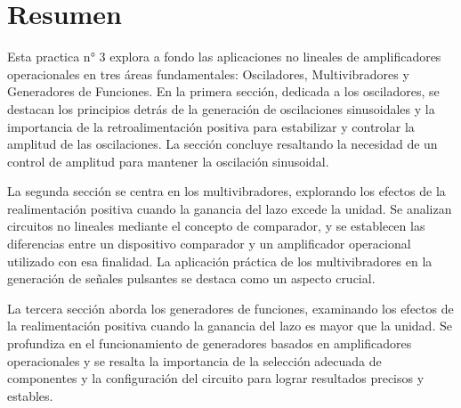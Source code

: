 
\section{Resumen}

Esta practica n° 3 explora a fondo las aplicaciones no lineales de amplificadores operacionales en tres áreas fundamentales: Osciladores, Multivibradores y Generadores de Funciones. En la primera sección, dedicada a los osciladores, se destacan los principios detrás de la generación de oscilaciones sinusoidales y la importancia de la retroalimentación positiva para estabilizar y controlar la amplitud de las oscilaciones. La sección concluye resaltando la necesidad de un control de amplitud para mantener la oscilación sinusoidal.

La segunda sección se centra en los multivibradores, explorando los efectos de la realimentación positiva cuando la ganancia del lazo excede la unidad. Se analizan circuitos no lineales mediante el concepto de comparador, y se establecen las diferencias entre un dispositivo comparador y un amplificador operacional utilizado con esa finalidad. La aplicación práctica de los multivibradores en la generación de señales pulsantes se destaca como un aspecto crucial.

La tercera sección aborda los generadores de funciones, examinando los efectos de la realimentación positiva cuando la ganancia del lazo es mayor que la unidad. Se profundiza en el funcionamiento de generadores basados en amplificadores operacionales y se resalta la importancia de la selección adecuada de componentes y la configuración del circuito para lograr resultados precisos y estables.
\newpage